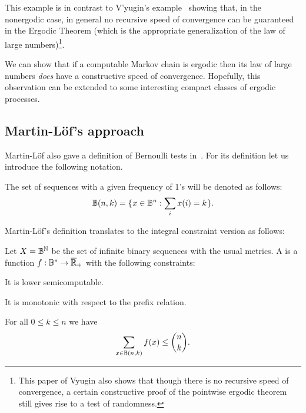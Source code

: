This example is in contrast to V'yugin's example~\cite{VyuginErgodic98}
showing that, in the nonergodic case,
in general no recursive speed of convergence can be guaranteed in the
Ergodic Theorem (which is the appropriate generalization of the law of large
numbers)\footnote{This paper of Vyugin also shows that though there is no recursive speed of
convergence, a certain constructive 
proof of the pointwise ergodic theorem still gives rise to a test of
randomness.}.

We can show that if a computable Markov chain is ergodic then
its law of large numbers \emph{does} have a constructive speed of convergence.
Hopefully, this observation can be extended to some interesting 
compact classes of ergodic processes.


\subsection{Martin-L\"of's approach}

Martin-L\"of also gave a definition of Bernoulli tests in~\cite{MLof66art}.
For its definition let us introduce the following notation.

 \begin{notation} The set of sequences with a given frequency of 1's will be
   denoted as follows:
 \begin{align*}
   \mathbb{B}(n,k) = \mathopen\{\mskip 1mu x\in\mathbb{B}^{n}: \sum_{i}x(i)=k\mskip 1mu\mathclose\}.
 \end{align*}
 \end{notation}

Martin-L\"of's definition translates to the integral constraint version as follows:

 \begin{definition}\label{def:combinat-Bernoulli}
Let \( X=\mathbb{B}^{\mathbb{N}} \) be the set of infinite binary sequences with the usual
metrics.
A  is a function
\( f:\mathbb{B}^{*}\to\overline{\mathbb{R}}_{+} \) with the following constraints:
 \begin{alphenum}
  \item It is lower semicomputable.
  \item It is monotonic with respect to the prefix relation.
  \item For all \( 0\le k\le n \) we have
 \begin{align}\label{eq:combinat-Bernoulli-sum}
      \sum_{x\in\mathbb{B}(n,k)} f(x) \le \binom{n}{k}.
 \end{align}
 \end{alphenum}
 \end{definition}

